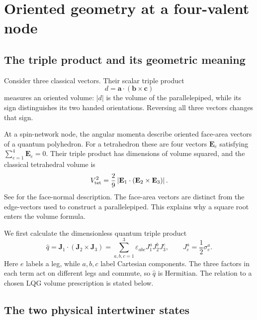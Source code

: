 \GPTBegin{}

\section{Oriented geometry at a four-valent node}
\label{sec:calc1}

\subsection{The triple product and its geometric meaning}

Consider three classical vectors. Their scalar triple product
\begin{equation}
 d=\mathbf a\cdot(\mathbf b\times\mathbf c)
\end{equation}
measures an oriented volume: $|d|$ is the volume of the parallelepiped,
while its sign distinguishes its two handed orientations. Reversing all
three vectors changes that sign.

At a spin-network node, the angular momenta describe oriented face-area
vectors of a quantum polyhedron. For a tetrahedron these are four vectors
$\mathbf E_e$ satisfying $\sum_{e=1}^4\mathbf E_e=0$. Their triple product
has dimensions of volume squared, and the classical tetrahedral volume is
\begin{equation}
 V_{\rm tet}^2=\frac{2}{9}
 \left|\mathbf E_1\cdot(\mathbf E_2\times\mathbf E_3)\right|.
\end{equation}
See \cite{Bianchi2013QuantumGeometry} for the face-normal description.
The face-area vectors are distinct from the edge-vectors used to construct
a parallelepiped. This explains why a square root enters the volume formula.

We first calculate the dimensionless quantum triple product
\begin{equation}\label{eqn:q-def}
 \hat q=\mathbf J_1\cdot(\mathbf J_2\times\mathbf J_3)
 =\sum_{a,b,c=1}^3\varepsilon_{abc}J_1^aJ_2^bJ_3^c,
 \qquad J_e^a=\frac12\sigma_e^a.
\end{equation}
Here $e$ labels a leg, while $a,b,c$ label Cartesian components. The three
factors in each term act on different legs and commute, so $\hat q$ is
Hermitian. The relation to a chosen LQG volume prescription is stated below.

\subsection{The two physical intertwiner states}
\label{sub:cg}\label{sub:singlet-basis}

